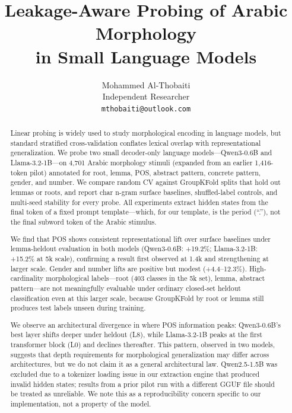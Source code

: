 \documentclass[11pt,a4paper]{article}
\title{Leakage-Aware Probing of Arabic Morphology \\ in Small Language Models}
\author{Mohammed Al-Thobaiti\\
Independent Researcher\\
\texttt{mthobaiti@outlook.com}}
\date{}
\begin{document}
\maketitle

\begin{abstract}
Linear probing is widely used to study morphological encoding in language models, but standard stratified cross-validation conflates lexical overlap with representational generalization. We probe two small decoder-only language models---Qwen3-0.6B and Llama-3.2-1B---on 4,701 Arabic morphology stimuli (expanded from an earlier 1,416-token pilot) annotated for root, lemma, POS, abstract pattern, concrete pattern, gender, and number. We compare random CV against GroupKFold splits that hold out lemmas or roots, and report char n-gram surface baselines, shuffled-label controls, and multi-seed stability for every probe. All experiments extract hidden states from the final token of a fixed prompt template---which, for our template, is the period (``.''), not the final subword token of the Arabic stimulus.

We find that POS shows consistent representational lift over surface baselines under lemma-heldout evaluation in both models (Qwen3-0.6B: +19.2\%; Llama-3.2-1B: +15.2\% at 5k scale), confirming a result first observed at 1.4k and strengthening at larger scale. Gender and number lifts are positive but modest (+4.4--12.3\%). High-cardinality morphological labels---root (403 classes in the 5k set), lemma, abstract pattern---are not meaningfully evaluable under ordinary closed-set heldout classification even at this larger scale, because GroupKFold by root or lemma still produces test labels unseen during training.

We observe an architectural divergence in where POS information peaks: Qwen3-0.6B's best layer shifts deeper under heldout (L8), while Llama-3.2-1B peaks at the first transformer block (L0) and declines thereafter. This pattern, observed in two models, suggests that depth requirements for morphological generalization may differ across architectures, but we do not claim it as a general architectural law. Qwen2.5-1.5B was excluded due to a tokenizer loading issue in our extraction engine that produced invalid hidden states; results from a prior pilot run with a different GGUF file should be treated as unreliable. We note this as a reproducibility concern specific to our implementation, not a property of the model.
\end{abstract}

\end{document}
